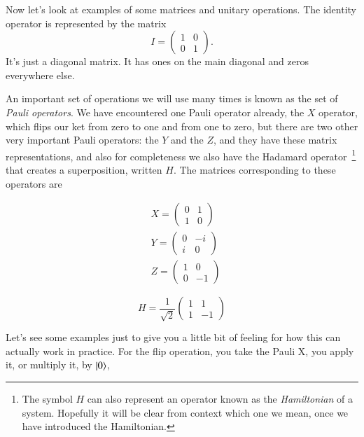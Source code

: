 Now let's look at examples of some matrices and unitary operations. The identity operator is represented by the matrix
\begin{equation}
I=\left(\begin{array}{ll}
1 & 0 \\
0 & 1
\end{array}\right).
\end{equation}
It's just a diagonal matrix. It has ones on the main diagonal and zeros everywhere else.

An important set of operations we will use many times is known as the set of \emph{Pauli operators}. We have encountered one Pauli operator already, the $X$ operator, which flips our ket from zero to one and from one to zero, but there are two other very important Pauli operators: the $Y$ and the $Z$, and they have these matrix representations, and also for completeness we also have the Hadamard operator~\footnote{The symbol $H$ can also represent an operator known as the \emph{Hamiltonian} of a system.  Hopefully it will be clear from context which one we mean, once we have introduced the Hamiltonian.} that creates a superposition, written $H$.  The matrices corresponding to these operators are

\begin{equation}
\begin{aligned}
&X=\left(\begin{array}{ll}
0 & 1 \\
1 & 0
\end{array}\right) \\
&Y=\left(\begin{array}{cc}
0 & -i \\
i & 0
\end{array}\right) \\
&Z=\left(\begin{array}{cc}
1 & 0 \\
0 & -1
\end{array}\right)
\end{aligned}
\end{equation}

\begin{equation}
H=\frac{1}{\sqrt{2}}\left(\begin{array}{cc}
1 & 1 \\
1 & -1
\end{array}\right)
\end{equation}


Let's see some examples just to give you a little bit of feeling for how this can actually work in practice. For the flip operation, you take the Pauli X, you apply it, or multiply it, by $\left| 0 \right\rangle$,

